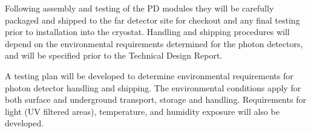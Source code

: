 






Following assembly and testing of the PD modules they will be carefully packaged and shipped to the far detector site for checkout and any final testing prior to installation into the cryostat. Handling and shipping procedures will depend on the environmental requirements determined for the photon detectors, and will be specified prior to the Technical Design Report.

A testing plan will be developed to determine environmental requirements for photon detector handling and shipping. The environmental conditions apply for both surface and underground transport, storage and handling. Requirements for light (UV filtered areas), temperature, and humidity exposure will also be developed.


